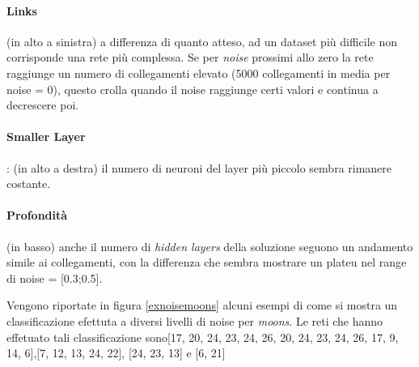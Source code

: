 \documentclass[12pt,a4paper]{report}
\begin{document}
\paragraph{Links} (in alto a sinistra) a differenza di quanto atteso, ad un dataset più difficile non corrisponde una rete più complessa. 
Se per \textit{noise} prossimi allo zero la rete raggiunge un numero di collegamenti elevato (5000 collegamenti in media per noise = 0), questo crolla quando il noise raggiunge certi valori e continua a decrescere poi.

\paragraph{Smaller Layer}: (in alto a destra) il numero di neuroni del layer più piccolo sembra rimanere costante.

\paragraph{Profondità} (in basso) anche il numero di \textit{hidden layers} della soluzione seguono un andamento simile ai collegamenti, con la differenza che sembra mostrare un plateu nel range di noise = [0.3;0.5].

Vengono riportate in figura \ref{exnoisemoons} alcuni esempi di come si mostra un classificazione efettuta a diversi livelli di noise per \textit{moons}.
Le reti che hanno effetuato tali classificazione sono[17, 20, 24, 23, 24, 26, 20, 24, 23, 24, 26, 17, 9, 14, 6],[7, 12, 13, 24, 22], [24, 23, 13] e [6, 21]
\end{document}
